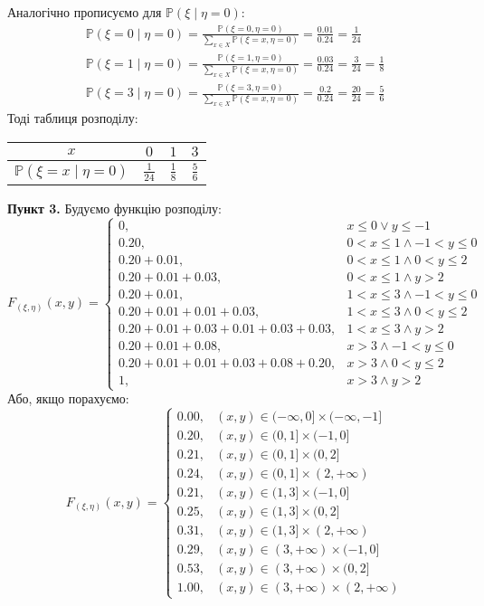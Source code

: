 \documentclass[14pt]{extarticle}
\begin{document}
Аналогічно прописуємо для $\mathbb{P}(\xi \mid \eta=0)$:
\begin{gather*}
    \mathbb{P}(\xi=0 \mid \eta=0) = \frac{\mathbb{P}(\xi=0,\eta=0)}{\sum_{x \in X}\mathbb{P}(\xi=x,\eta=0)} = \frac{0.01}{0.24} = \frac{1}{24} \\
    \mathbb{P}(\xi=1 \mid \eta=0) = \frac{\mathbb{P}(\xi=1,\eta=0)}{\sum_{x \in X}\mathbb{P}(\xi=x,\eta=0)} = \frac{0.03}{0.24} = \frac{3}{24} = \frac{1}{8} \\
    \mathbb{P}(\xi=3 \mid \eta=0) = \frac{\mathbb{P}(\xi=3,\eta=0)}{\sum_{x \in X}\mathbb{P}(\xi=x,\eta=0)} = \frac{0.2}{0.24} = \frac{20}{24} = \frac{5}{6}
\end{gather*}
Тоді таблиця розподілу:
\begin{center}
\begin{tabular}{ |c|c|c|c| } 
 \hline
 $x$ & $0$ & $1$ & $3$ \\ 
 \hline
 $\mathbb{P}(\xi=x\mid \eta=0)$ & $\frac{1}{24}$ & $\frac{1}{8}$ & $\frac{5}{6}$ \\ 
 \hline
\end{tabular}
\end{center}

\textbf{Пункт 3.} Будуємо функцію розподілу:
\[
F_{(\xi,\eta)}(x,y) = \begin{cases}
    0, & x \leq 0 \vee y \leq -1 \\
    0.20, & 0 < x \leq 1 \wedge -1 < y \leq 0 \\
    0.20+0.01, & 0 < x \leq 1 \wedge 0 < y \leq 2 \\
    0.20+0.01+0.03, & 0 < x \leq 1 \wedge y > 2 \\
    0.20+0.01, & 1 < x \leq 3 \wedge -1 < y \leq 0 \\
    0.20+0.01+0.01+0.03, & 1 < x \leq 3 \wedge 0 < y \leq 2 \\
    0.20+0.01+0.03+0.01+0.03+0.03, & 1 < x \leq 3 \wedge y > 2 \\
    0.20 + 0.01 + 0.08, & x > 3 \wedge -1 < y \leq 0 \\
    0.20+0.01+0.01+0.03+0.08+0.20, & x > 3 \wedge 0 < y \leq 2 \\
    1, & x > 3 \wedge y > 2
\end{cases}
\]
Або, якщо порахуємо:
\[
F_{(\xi,\eta)}(x,y) = \begin{cases}
    0.00, & (x,y) \in (-\infty,0] \times (-\infty,-1] \\
    0.20, & (x,y) \in (0,1] \times (-1,0] \\
    0.21, & (x,y) \in (0,1] \times (0,2] \\
    0.24, & (x,y) \in (0,1] \times (2,+\infty) \\
    0.21, & (x,y) \in (1,3] \times (-1,0] \\
    0.25, & (x,y) \in (1,3] \times (0,2] \\
    0.31, & (x,y) \in (1,3] \times (2,+\infty) \\
    0.29, & (x,y) \in (3,+\infty) \times (-1,0] \\
    0.53, & (x,y) \in (3,+\infty) \times (0,2] \\
    1.00, & (x,y) \in (3,+\infty) \times (2,+\infty)
\end{cases}
\]
\end{document}

